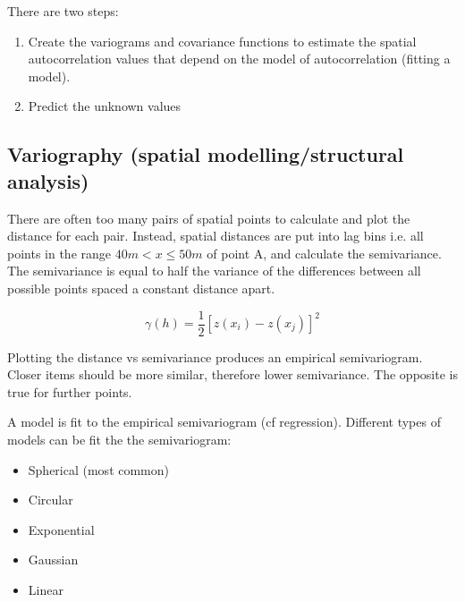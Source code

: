 \documentclass{article}
\begin{document}
There are two steps:

\begin{enumerate}
    \item Create the variograms and covariance functions to estimate the spatial autocorrelation values that depend on the model of autocorrelation (fitting a model).
    \item Predict the unknown values
\end{enumerate}

\subsection{Variography (spatial modelling/structural analysis)}

There are often too many pairs of spatial points to calculate and plot the distance for each pair.
Instead, spatial distances are put into lag bins i.e. all points in the range $40m < x \le 50m$ of point A, and calculate the semivariance.
The semivariance is equal to half the variance of the differences between all possible points spaced a constant distance apart.

\[\gamma (h) = \frac{1}{2}\left[z(x_{i}) - z(x_{j})\right]^2\]

Plotting the distance vs semivariance produces an empirical semivariogram.
Closer items should be more similar, therefore lower semivariance.
The opposite is true for further points.

A model is fit to the empirical semivariogram (cf regression).
Different types of models can be fit the the semivariogram:

\begin{itemize}
    \item Spherical (most common)
    \item Circular
    \item Exponential
    \item Gaussian
    \item Linear
\end{itemize}

\begin{center}
\end{center}
\end{document}

